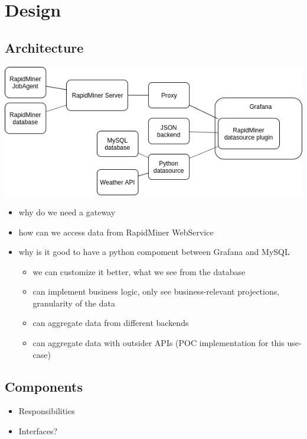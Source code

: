 \chapter{Design}

\section{Architecture}

\includegraphics{figures/architecture.png}

\begin{itemize}
	\item why do we need a gateway
	\item how can we access data from RapidMiner WebService
	\item why is it good to have a python compoment between Grafana and MySQL
	\begin{itemize}
		\item we can customize it better, what we see from the database
		\item can implement business logic, only see business-relevant projections, granularity of the data
		\item can aggregate data from different backends
		\item can aggregate data with outsider APIs (POC implementation for this use-case)
	\end{itemize}
\end{itemize}

\section{Components}

\begin{itemize}
	\item Responsibilities
	\item Interfaces?
\end{itemize}

